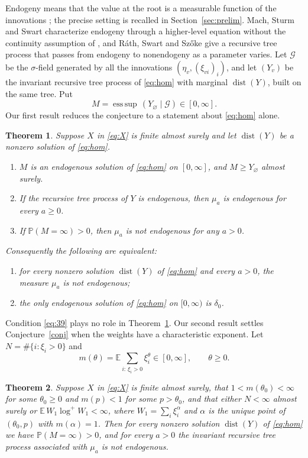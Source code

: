 \documentclass[11pt]{amsart}
\newtheorem{theorem}{Theorem}[section]
\theoremstyle{remark}
\newcommand{\Ga}{\mathcal{G}}
\newcommand{\Pb}{\mathbb{P}}
\newcommand{\E}{\mathbb{E}}
\newcommand{\esssup}{\operatorname*{ess\,sup}}
\newcommand{\dist}{\operatorname{dist}}
\begin{document}
Endogeny means that the value at the root is a measurable function of the innovations
\cite[Definition~7]{AB}; the precise setting is recalled in Section~\ref{sec:prelim}.
Mach, Sturm and Swart \cite{MSS} characterize endogeny through a higher-level equation
without the continuity assumption of \cite{AB}, and R\'ath, Swart and Sz\H{o}ke \cite{RSS}
give a recursive tree process that passes from endogeny to nonendogeny as a parameter varies.
Let $\Ga$ be the $\sigma$-field generated by all the innovations
$(\eta_v,(\xi_{vi})_i)$, and let $(Y_v)$ be the invariant recursive tree process of
\eqref{eq:hom} with marginal $\dist(Y)$, built on the same tree. Put
\[
M=\esssup\,(Y_\varnothing\mid \Ga)\in[0,\infty].
\]
Our first result reduces the conjecture to a statement about \eqref{eq:hom} alone.

\begin{theorem}\label{thm:main}
Suppose $X$ in \eqref{eq:X} is finite almost surely and let $\dist(Y)$ be a nonzero
solution of \eqref{eq:hom}.
\begin{enumerate}
\item[(a)] $M$ is an endogenous solution of \eqref{eq:hom} on $[0,\infty]$, and
$M\ge Y_\varnothing$ almost surely.
\item[(b)] If the recursive tree process of $Y$ is endogenous, then $\mu_a$ is endogenous
for every $a\ge0$.
\item[(c)] If $\Pb(M=\infty)>0$, then $\mu_a$ is not endogenous for any $a>0$.
\end{enumerate}
Consequently the following are equivalent:
\begin{enumerate}
\item[(i)] for every nonzero solution $\dist(Y)$ of \eqref{eq:hom} and every $a>0$, the
measure $\mu_a$ is not endogenous;
\item[(ii)] the only endogenous solution of \eqref{eq:hom} on $[0,\infty)$ is $\delta_0$.
\end{enumerate}
\end{theorem}

Condition \eqref{eq:39} plays no role in Theorem~\ref{thm:main}. Our second result settles
Conjecture~\ref{conj} when the weights have a characteristic exponent. Let
$N=\#\{i:\xi_i>0\}$ and
\[
m(\theta)=\E\sum_{i:\,\xi_i>0}\xi_i^{\theta}\in[0,\infty],\qquad \theta\ge0 .
\]

\begin{theorem}\label{thm:regular}
Suppose $X$ in \eqref{eq:X} is finite almost surely, that $1<m(\theta_0)<\infty$ for some
$\theta_0\ge 0$ and $m(p)<1$ for some $p>\theta_0$, and that either $N<\infty$ almost surely
or $\E\, W_1\log^+W_1<\infty$, where $W_1=\sum_i\xi_i^{\alpha}$ and $\alpha$ is the unique
point of $(\theta_0,p)$ with $m(\alpha)=1$. Then for every nonzero solution $\dist(Y)$ of
\eqref{eq:hom} we have $\Pb(M=\infty)>0$, and for every $a>0$ the invariant recursive tree
process associated with $\mu_a$ is not endogenous.
\end{theorem}
\end{document}
